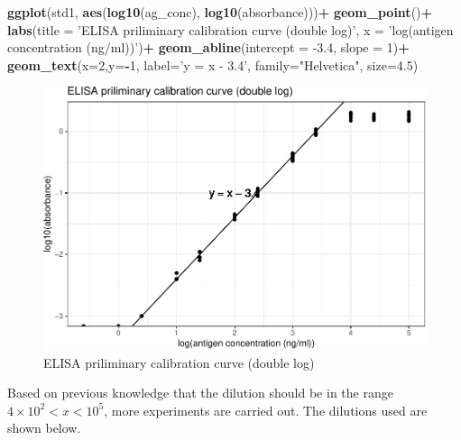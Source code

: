 \documentclass[
]{article}
\newenvironment{Shaded}{\begin{snugshade}}{\end{snugshade}}
\newcommand{\DataTypeTok}[1]{\textcolor[rgb]{0.13,0.29,0.53}{#1}}
\newcommand{\DecValTok}[1]{\textcolor[rgb]{0.00,0.00,0.81}{#1}}
\newcommand{\FloatTok}[1]{\textcolor[rgb]{0.00,0.00,0.81}{#1}}
\newcommand{\KeywordTok}[1]{\textcolor[rgb]{0.13,0.29,0.53}{\textbf{#1}}}
\newcommand{\NormalTok}[1]{#1}
\newcommand{\OperatorTok}[1]{\textcolor[rgb]{0.81,0.36,0.00}{\textbf{#1}}}
\newcommand{\StringTok}[1]{\textcolor[rgb]{0.31,0.60,0.02}{#1}}
\begin{document}
\begin{Shaded}
\begin{Highlighting}[]
\KeywordTok{ggplot}\NormalTok{(std1, }\KeywordTok{aes}\NormalTok{(}\KeywordTok{log10}\NormalTok{(ag_conc), }\KeywordTok{log10}\NormalTok{(absorbance)))}\OperatorTok{+}
\StringTok{  }\KeywordTok{geom_point}\NormalTok{()}\OperatorTok{+}
\StringTok{  }\KeywordTok{labs}\NormalTok{(}\DataTypeTok{title =} \StringTok{'ELISA priliminary calibration curve (double log)'}\NormalTok{,}
       \DataTypeTok{x =} \StringTok{'log(antigen concentration (ng/ml))'}\NormalTok{)}\OperatorTok{+}
\StringTok{  }\KeywordTok{geom_abline}\NormalTok{(}\DataTypeTok{intercept =} \FloatTok{-3.4}\NormalTok{, }\DataTypeTok{slope =} \DecValTok{1}\NormalTok{)}\OperatorTok{+}
\StringTok{  }\KeywordTok{geom_text}\NormalTok{(}\DataTypeTok{x=}\DecValTok{2}\NormalTok{,}\DataTypeTok{y=}\OperatorTok{-}\DecValTok{1}\NormalTok{, }\DataTypeTok{label=}\StringTok{'y = x - 3.4'}\NormalTok{, }\DataTypeTok{family=}\StringTok{"Helvetica"}\NormalTok{, }\DataTypeTok{size=}\FloatTok{4.5}\NormalTok{)}
\end{Highlighting}
\end{Shaded}

\begin{figure}
\includegraphics[width=1\linewidth]{2020-03-08-immunoassay-in-silico_files/figure-latex/elisa-std-1-1} \caption{ELISA priliminary calibration curve (double log)}\label{fig:elisa-std-1}
\end{figure}

Based on previous knowledge that the dilution should be in the range \(4\times10^2 < x < 10^5\), more experiments are carried out. The dilutions used are shown below.
\end{document}
